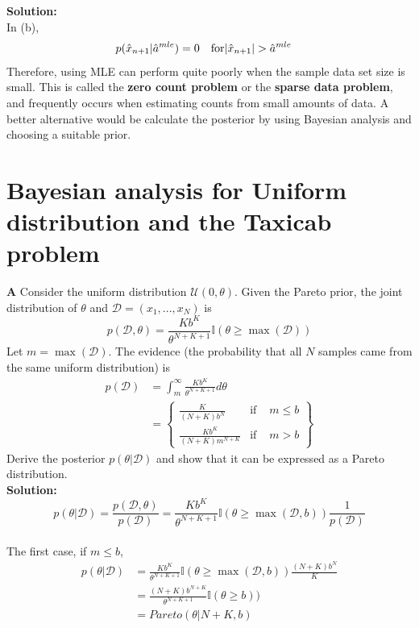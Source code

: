 \documentclass{article}
\begin{document}
\textbf{Solution:} \\
In (b),
\begin{equation}
\begin{aligned}
    p(\hat{x}_{n+1}|\hat{a}^{mle}) & =  0  & \mbox{for} & \abs{\hat{x}_{n+1}} > \hat{a}^{mle} 
\end{aligned}
\end{equation}
Therefore, using MLE can perform quite poorly when the sample data set size is small. This is called the \textbf{zero count problem} or the \textbf{sparse data problem}, and frequently occurs when estimating counts from small amounts of data. A better alternative would be calculate the posterior by using Bayesian analysis and choosing a suitable prior. 

\newpage
\section{Bayesian analysis for Uniform distribution and the Taxicab problem}
\textbf{A} Consider the uniform distribution $\mathcal{U}(0,\theta)$. Given the Pareto prior, the joint distribution of $\theta$ and $\mathcal{D} = (x_1,...,x_{N})$ is
\begin{equation}
p(\mathcal{D},\theta) = \frac{Kb^{K}}{\theta^{N+K+1}} \mathbb{I}(\theta \geq \max(\mathcal{D}))   
\end{equation}
Let $m = \max(\mathcal{D})$. The evidence (the probability that all $N$ samples came from the same uniform distribution) is
\begin{equation}
\begin{aligned}
p(\mathcal{D}) & = \int_{m}^{\infty} \frac{Kb^{K}}{\theta^{N+K+1}} d\theta \\
& = \left\{ \begin{array}{rcl}
         \frac{K}{(N+K)b^{N}} & \mbox{if }
         &  m \leq b\\ 
         \frac{Kb^{K}}{(N+K)m^{N+K}}  & \mbox{if}  & m>b  
         \end{array} \right\}
\end{aligned} 
\end{equation}
Derive the posterior $p(\theta | \mathcal{D})$ and show that it can be expressed as a Pareto distribution.
\\
\textbf{Solution:}
\begin{equation}
  p(\theta | \mathcal{D}) = \frac{p(\mathcal{D},\theta)}{p(\mathcal{D})} = \frac{Kb^{K}}{\theta^{N+K+1}} \mathbb{I}(\theta \geq \max(\mathcal{D},b))   \frac{1}{p(\mathcal{D})} 
\end{equation}
\\
The first case, if $m \leq b$,
\begin{equation}
\begin{aligned}
 p(\theta | \mathcal{D}) & = \frac{Kb^{K}}{\theta^{N+K+1}} \mathbb{I}(\theta \geq \max(\mathcal{D},b))  \frac{(N+K)b^{N}}{K} \\
 & = \frac{(N+K)b^{N+K}}{\theta^{N+K+1}} \mathbb{I}(\theta \geq b)) \\
 & = Pareto(\theta|N+K,b)
\end{aligned}
\end{equation}
\end{document}
